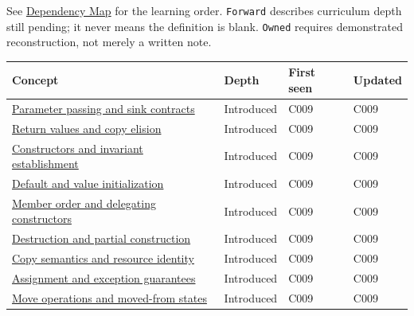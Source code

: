 See \hyperref[appendix-4ad47bdd269a]{Dependency Map} for the learning order. \texttt{Forward} describes curriculum depth still pending; it never means the definition is blank. \texttt{Owned} requires demonstrated reconstruction, not merely a written note.

{\def\LTcaptype{none} %
\begin{longtable}[]{@{}
  >{\raggedright\arraybackslash}p{}
  >{\raggedright\arraybackslash}p{}
  >{\raggedright\arraybackslash}p{}
  >{\raggedright\arraybackslash}p{}@{}}
\toprule\noalign{}
\begin{minipage}[b]{\linewidth}\raggedright
Concept
\end{minipage} & \begin{minipage}[b]{\linewidth}\raggedright
Depth
\end{minipage} & \begin{minipage}[b]{\linewidth}\raggedright
First seen
\end{minipage} & \begin{minipage}[b]{\linewidth}\raggedright
Updated
\end{minipage} \\
\midrule\noalign{}
\endhead
\bottomrule\noalign{}
\endlastfoot
\hyperref[appendix-d5908f75721f]{Parameter passing and sink contracts} & Introduced & C009 & C009 \\
\hyperref[appendix-b08d3788c5c6]{Return values and copy elision} & Introduced & C009 & C009 \\
\hyperref[appendix-7f8ec83d0886]{Constructors and invariant establishment} & Introduced & C009 & C009 \\
\hyperref[appendix-ba8c1a9fe03f]{Default and value initialization} & Introduced & C009 & C009 \\
\hyperref[appendix-3cb49709605a]{Member order and delegating constructors} & Introduced & C009 & C009 \\
\hyperref[appendix-9bfe377cef7a]{Destruction and partial construction} & Introduced & C009 & C009 \\
\hyperref[appendix-1340cd1ce582]{Copy semantics and resource identity} & Introduced & C009 & C009 \\
\hyperref[appendix-bea6beb5350f]{Assignment and exception guarantees} & Introduced & C009 & C009 \\
\hyperref[appendix-5636651017c2]{Move operations and moved-from states} & Introduced & C009 & C009 \\

\end{longtable}}
